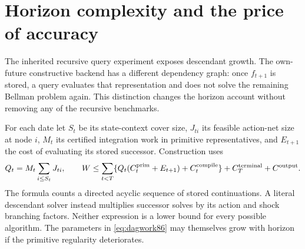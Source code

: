 \section{Horizon complexity and the price of accuracy}\label{sec:complexity86}
The inherited recursive query experiment exposes descendant growth. The own-future constructive backend has a different dependency graph: once $f_{t+1}$ is stored, a query evaluates that representation and does not solve the remaining Bellman problem again. This distinction changes the horizon account without removing any of the recursive benchmarks.

For each date let $S_t$ be its state-context cover size, $J_{ti}$ its feasible action-net size at node $i$, $M_t$ its certified integration work in primitive representatives, and $E_{t+1}$ the cost of evaluating its stored successor. Construction uses
\begin{equation}\label{eq:dagwork86}
 Q_t=M_t\sum_{i\le S_t}J_{ti},\qquad
 W\le\sum_{t<T}\{Q_t(C_t^{\rm prim}+E_{t+1})+C_t^{\rm compile}\}
       +C_T^{\rm terminal}+C^{\rm output}.
\end{equation}
The formula counts a directed acyclic sequence of stored continuations. A literal descendant solver instead multiplies successor solves by its action and shock branching factors. Neither expression is a lower bound for every possible algorithm. The parameters in \eqref{eq:dagwork86} may themselves grow with horizon if the primitive regularity deteriorates.


